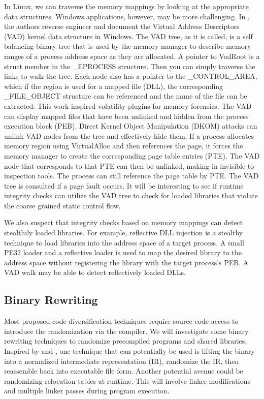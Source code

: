 \documentclass[preprint,12pt]{elsarticle}
\begin{document}
In Linux, we can traverse the memory mappings by looking at the appropriate data structures. Windows applications, however, may be more challenging. In \cite{dolan2007vad}, the authors reverse engineer and document the Virtual Address Descriptors (VAD) kernel data structure in Windows. The VAD tree, as it is called, is a self balancing binary tree that is used by the memory manager to describe memory ranges of a process address space as they are allocated. A pointer to VadRoot is a struct member in the \_EPROCESS structure. Then you can simply traverse the links to walk the tree. Each node also has a pointer to the \_CONTROL\_AREA, which if the region is used for a mapped file (DLL), the corresponding \_FILE\_OBJECT structure can be referenced and the name of the file can be extracted. This work inspired volatility plugins for memory forensics. The VAD can display mapped files that have been unlinked and hidden from the process execution block (PEB). Direct Kernel Object Manipulation (DKOM) attacks can unlink VAD nodes from the tree and effectively hide them. If a process allocates memory region using VirtualAlloc and then references the page, it forces the memory manager to create the corresponding page table entries (PTE). The VAD node that corresponds to that PTE can then be unlinked, making in invisible to inspection tools. The process can still reference the page table by PTE. The VAD tree is consulted if a page fault occurs. It will be interesting to see if runtime integrity checks can utilize the VAD tree to check for loaded libraries that violate the coarse grained static control flow.

We also suspect that integrity checks based on memory mappings can detect stealthily loaded libraries. For example, reflective DLL injection \cite{fewer2008reflective} is a stealthy technique to load libraries into the address space of a target process. A small PE32 loader and a reflective loader is used to map the desired library to the address space without registering the library with the target process's PEB. A VAD walk may be able to detect reflectively loaded DLLs.

\subsection{Binary Rewriting}

Most proposed code diversification techniques require source code access to introduce the randomization via the compiler. We will investigate some binary rewriting techniques to randomize precompiled programs and shared libraries.  Inspired by \cite{david2017similarity} and \cite{abrath2015obfuscating}, one technique that can potentially be used is lifting the binary into a normalized intermediate representation (IR), randomize the IR, then reassemble back into executable file form. Another potential avenue could be randomizing relocation tables at runtime. This will involve linker modifications and multiple linker passes during program execution.
\end{document}
